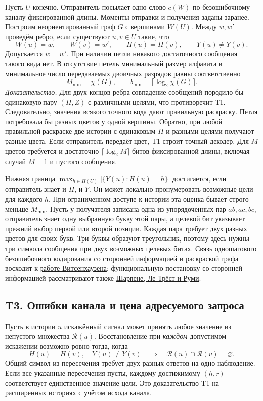 Пусть $U$ конечно. Отправитель посылает одно слово $c(W)$ по безошибочному
каналу фиксированной длины. Моменты отправки и получения заданы заранее.
Построим неориентированный граф $G$ с вершинами $W(U)$. Между $w,w'$ проведём
ребро, если существуют $u,v\in U$ такие, что
\[
 W(u)=w,\qquad W(v)=w',\qquad H(u)=H(v),\qquad Y(u)\ne Y(v).
\]
Допускается $w=w'$. При наличии петли никакого достаточного сообщения такого
вида нет. В отсутствие петель минимальный размер алфавита и минимальное
число передаваемых двоичных разрядов равны соответственно
\[
 M_{\min}=\chi(G),\qquad b_{\min}=\lceil\log_2\chi(G)\rceil .
\]
\emph{Доказательство.} Для двух концов ребра совпадение сообщений породило бы
одинаковую пару $(H,Z)$ с различными целями, что противоречит T1. Следовательно,
значения всякого точного кода дают правильную раскраску. Петля потребовала бы
разных цветов у одной вершины. Обратно, при любой правильной раскраске две
истории с одинаковым $H$ и разными целями получают разные цвета. Если
отправитель передаёт цвет, T1 строит точный декодер. Для $M$ цветов требуется
и достаточно $\lceil\log_2 M\rceil$ битов фиксированной длины, включая
случай $M=1$ и пустого сообщения.

Нижняя граница $\max_{h\in H(U)}|\{Y(u):H(u)=h\}|$ достигается, если
отправитель знает и $H$, и $Y$. Он может локально пронумеровать возможные
цели для каждого $h$. При ограниченном доступе к истории эта оценка бывает
строго меньше $M_{\min}$. Пусть у получателя записана одна из упорядоченных
пар $ab,ac,bc$, отправитель знает одну выбранную букву этой пары, а целевой
бит указывает прежний выбор первой или второй позиции. Каждая пара требует
двух разных цветов для своих букв. Три буквы образуют треугольник, поэтому
здесь нужны три символа сообщения при двух возможных целевых битах.
Связь одношагового безошибочного кодирования со сторонней информацией и
раскраской графа восходит к
\href{https://doi.org/10.1109/TIT.1976.1055607}{работе Витсенхаузена};
функциональную постановку со сторонней информацией рассматривают также
\href{https://doi.org/10.3390/e26040338}{Шарпене, Ле Трёст и Руми}.

\subsection{T3. Ошибки канала и цена адресуемого запроса}
\label{thm:observer-t3}

Пусть в истории $u$ искажённый сигнал может принять любое значение из
непустого множества $\mathcal R(u)$. Восстановление при \emph{каждом}
допустимом искажении возможно ровно тогда, когда
\[
 H(u)=H(v),\quad Y(u)\ne Y(v)
 \quad\Longrightarrow\quad \mathcal R(u)\cap\mathcal R(v)=\varnothing .
\]
Общий символ из пересечения требует двух разных ответов на одно наблюдение.
Если все указанные пересечения пусты, каждому достижимому $(h,r)$
соответствует единственное значение цели. Это доказательство T1 на расширенных
историях с учётом исхода канала.

